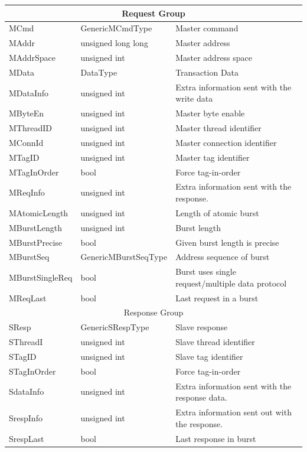 \documentclass[12pt,oneside]{gsbook}
\begin{document}
\begin{tabular}{l|l|p{6.5cm}}

\multicolumn{3}{c}{Request Group} \\ \hline
 MCmd & GenericMCmdType &  Master command \\
 MAddr & unsigned long long &  Master address \\
 MAddrSpace & unsigned int &  Master address space \\
 MData & DataType & Transaction Data\\
 MDataInfo & unsigned int &  Extra information sent with the write data \\
 MByteEn & unsigned int &  Master byte enable \\
 MThreadID & unsigned int &  Master thread identifier \\
 MConnId & unsigned int &  Master connection identifier \\
 MTagID & unsigned int &  Master tag identifier  \\
 MTagInOrder & bool &  Force tag-in-order  \\
 MReqInfo & unsigned int &  Extra information sent with the response. \\
 MAtomicLength & unsigned int &  Length of atomic burst \\
 MBurstLength & unsigned int &  Burst length \\
 MBurstPrecise & bool &  Given burst length is precise \\
 MBurstSeq & GenericMBurstSeqType &  Address sequence of burst \\
 MBurstSingleReq & bool &  Burst uses single request/multiple data protocol \\
 MReqLast & bool &  Last request in a burst \\
  
\multicolumn{3}{c}{Response Group} \\ \hline
 SResp & GenericSRespType &  Slave response \\
 SThreadI &  unsigned int &  Slave thread identifier \\
 STagID & unsigned int &  Slave tag identifier  \\
 STagInOrder & bool &  Force tag-in-order  \\
 SdataInfo & unsigned int &  Extra information sent with the response data. \\
 SrespInfo & unsigned int &  Extra information sent out with the response. \\
 SrespLast & bool &  Last response in burst \\


\end{tabular}
\end{document}
